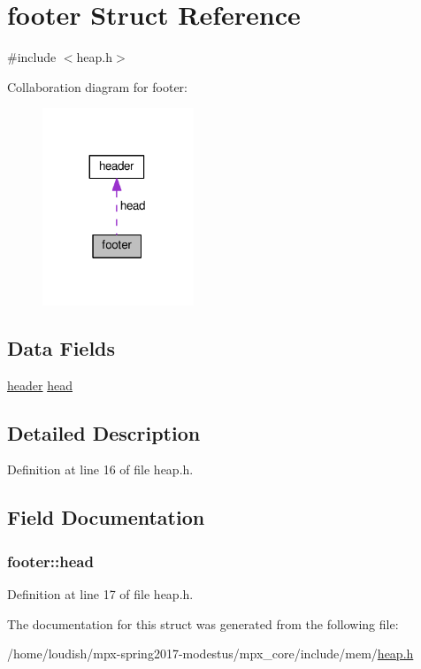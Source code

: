 \hypertarget{structfooter}{}\section{footer Struct Reference}
\label{structfooter}


{\ttfamily \#include $<$heap.\+h$>$}



Collaboration diagram for footer\+:\nopagebreak
\begin{figure}[H]
\begin{center}
\leavevmode
\includegraphics[width=128pt]{structfooter__coll__graph}
\end{center}
\end{figure}
\subsection*{Data Fields}
\begin{DoxyCompactItemize}
\item 
\hyperlink{structheader}{header} \hyperlink{structfooter_acae33dac61c9505ff5b850f88d32dd0b}{head}
\end{DoxyCompactItemize}


\subsection{Detailed Description}


Definition at line 16 of file heap.\+h.



\subsection{Field Documentation}
\subsubsection[{\texorpdfstring{head}{head}}]{ footer\+::head}\hypertarget{structfooter_acae33dac61c9505ff5b850f88d32dd0b}{}\label{structfooter_acae33dac61c9505ff5b850f88d32dd0b}


Definition at line 17 of file heap.\+h.



The documentation for this struct was generated from the following file\+:\begin{DoxyCompactItemize}
\item 
/home/loudish/mpx-\/spring2017-\/modestus/mpx\+\_\+core/include/mem/\hyperlink{heap_8h}{heap.\+h}\end{DoxyCompactItemize}
